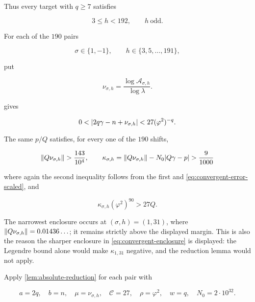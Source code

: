 Thus every target with $q\geqslant7$ satisfies

\begin{equation}
 3\leqslant h<192,
 \qquad
 h\ \text{odd}.
 \label{eq:h-192}
\end{equation}

For each of the $190$ pairs

\begin{equation}
 \sigma\in\{1,-1\},
 \qquad
 h\in\{3,5,\ldots,191\},
\end{equation}

put

\begin{equation}
 \nu_{\sigma,h}
 =\frac{\log\mathcal A_{\sigma,h}}{\log\lambda}.
\end{equation}

 gives

\begin{equation}
 0<\lvert2q\gamma-n+\nu_{\sigma,h}\rvert
 <27(\varphi^2)^{-q}.
 \label{eq:moving-reduction-form}
\end{equation}

The same $p/Q$ satisfies, for every one of the $190$ shifts,

\begin{equation}
 \left\lVert Q\nu_{\sigma,h}\right\rVert>\frac{143}{10^4},
 \qquad
 \kappa_{\sigma,h}
 =\left\lVert Q\nu_{\sigma,h}\right\rVert-N_0\lvert Q\gamma-p\rvert>\frac9{1000}
 \label{eq:moving-kappa}
\end{equation}

where again the second inequality follows from the first and
\cref{eq:convergent-error-scaled}, and

\begin{equation}
 \kappa_{\sigma,h}(\varphi^2)^{90}>27Q.
 \label{eq:moving-cutoff}
\end{equation}

The narrowest enclosure occurs at $(\sigma,h)=(1,31)$, where
$\left\lVert Q\nu_{\sigma,h}\right\rVert=0.01436\ldots$; it remains strictly above the
displayed margin. This is also the reason the sharper enclosure in
\cref{eq:convergent-enclosure} is displayed: the Legendre bound alone
would make $\kappa_{1,31}$ negative, and the reduction lemma would not
apply.

Apply \cref{lem:absolute-reduction}
for each pair with

\begin{equation}
 a=2q,\quad b=n,\quad \mu=\nu_{\sigma,h},\quad
 \mathcal C=27,\quad \rho=\varphi^2,\quad w=q,\quad N_0=2\mathbin{\cdot}10^{32}.
\end{equation}

